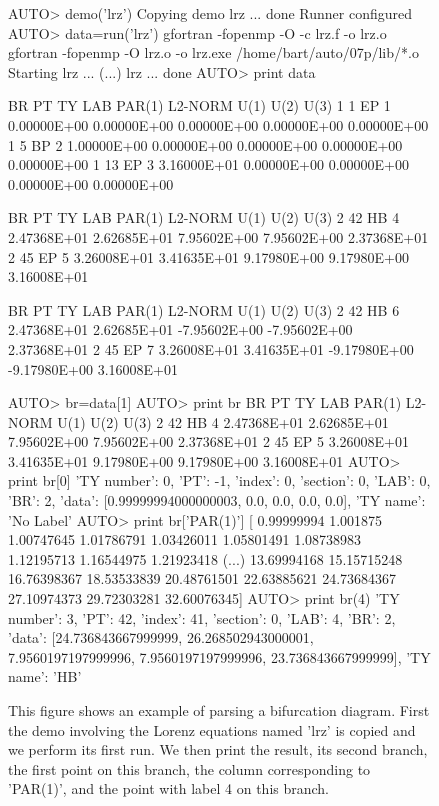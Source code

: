 \documentclass[12pt]{report}
\begin{document}
 \begin{figure}[htbp]
 {\small \begin{center} \begin{boxedverbatim}
 AUTO> demo('lrz')
 Copying demo lrz ... done
 Runner configured
 AUTO> data=run('lrz')
 gfortran -fopenmp -O -c lrz.f -o lrz.o
 gfortran -fopenmp -O lrz.o -o lrz.exe /home/bart/auto/07p/lib/*.o
 Starting lrz ...
(...)
lrz ... done
 AUTO> print data

  BR    PT  TY  LAB    PAR(1)        L2-NORM         U(1)          U(2)          U(3)     
   1     1  EP    1   0.00000E+00   0.00000E+00   0.00000E+00   0.00000E+00   0.00000E+00
   1     5  BP    2   1.00000E+00   0.00000E+00   0.00000E+00   0.00000E+00   0.00000E+00
   1    13  EP    3   3.16000E+01   0.00000E+00   0.00000E+00   0.00000E+00   0.00000E+00

  BR    PT  TY  LAB    PAR(1)        L2-NORM         U(1)          U(2)          U(3)     
   2    42  HB    4   2.47368E+01   2.62685E+01   7.95602E+00   7.95602E+00   2.37368E+01
   2    45  EP    5   3.26008E+01   3.41635E+01   9.17980E+00   9.17980E+00   3.16008E+01

  BR    PT  TY  LAB    PAR(1)        L2-NORM         U(1)          U(2)          U(3)     
   2    42  HB    6   2.47368E+01   2.62685E+01  -7.95602E+00  -7.95602E+00   2.37368E+01
   2    45  EP    7   3.26008E+01   3.41635E+01  -9.17980E+00  -9.17980E+00   3.16008E+01

 AUTO> br=data[1]
 AUTO> print br
  BR    PT  TY  LAB    PAR(1)        L2-NORM         U(1)          U(2)          U(3)     
   2    42  HB    4   2.47368E+01   2.62685E+01   7.95602E+00   7.95602E+00   2.37368E+01
   2    45  EP    5   3.26008E+01   3.41635E+01   9.17980E+00   9.17980E+00   3.16008E+01
 AUTO> print br[0]
 {'TY number': 0, 'PT': -1, 'index': 0, 'section': 0, 'LAB': 0, 'BR': 2,
  'data': [0.99999994000000003, 0.0, 0.0, 0.0, 0.0], 'TY name': 'No Label'}
 AUTO> print br['PAR(1)']
 [  0.99999994   1.001875     1.00747645   1.01786791   1.03426011
    1.05801491   1.08738983   1.12195713   1.16544975   1.21923418
(...)
   13.69994168  15.15715248  16.76398367  18.53533839  20.48761501
   22.63885621  24.73684367  27.10974373  29.72303281  32.60076345]
 AUTO> print br(4)
 {'TY number': 3, 'PT': 42, 'index': 41, 'section': 0, 'LAB': 4, 'BR': 2, 
  'data': [24.736843667999999, 26.268502943000001, 7.9560197197999996,
   7.9560197197999996, 23.736843667999999], 'TY name': 'HB'}
 \end{boxedverbatim}
 \end{center} 
 }
 \caption[An example of processing a bifurcation diagram of a run.]
 {This figure shows an example of parsing a bifurcation diagram.
 First the demo involving the Lorenz equations named 'lrz' is copied
 and we perform its first run. We then print
 the result, its second branch, the first point on this branch,
 the column corresponding to 'PAR(1)', and the point with
 label 4 on this branch.
 }
 \label{exa:clui parse diagram}
 \end{figure}
\end{document}
